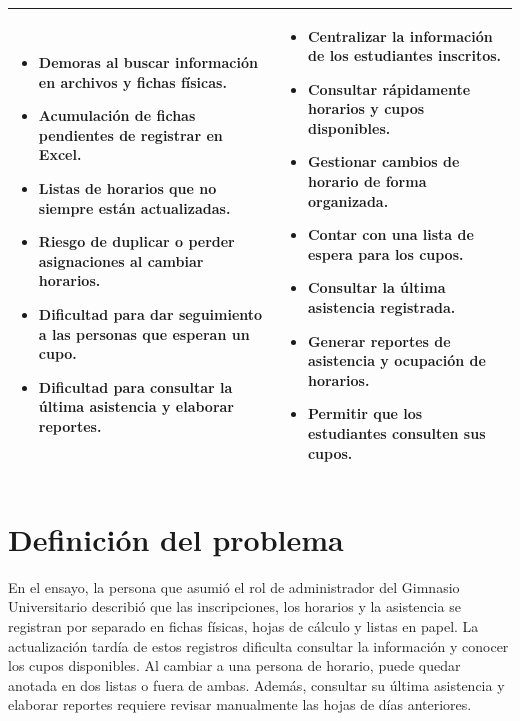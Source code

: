 \documentclass[11pt,a4paper]{article}
\begin{document}
\begin{center}
\begin{tabular}{|>{\raggedright\arraybackslash}p{}|
			>{\raggedright\arraybackslash}p{}|}
		\begin{itemize}[leftmargin=*,nosep,topsep=1pt]
			\item Demoras al buscar información en archivos y fichas físicas.
			\item Acumulación de fichas pendientes de registrar en Excel.
			\item Listas de horarios que no siempre están actualizadas.
			\item Riesgo de duplicar o perder asignaciones al cambiar horarios.
			\item Dificultad para dar seguimiento a las personas que esperan un cupo.
			\item Dificultad para consultar la última asistencia y elaborar reportes.
		\end{itemize}
		&
		\begin{itemize}[leftmargin=*,nosep,topsep=1pt]
			\item Centralizar la información de los estudiantes inscritos.
			\item Consultar rápidamente horarios y cupos disponibles.
			\item Gestionar cambios de horario de forma organizada.
			\item Contar con una lista de espera para los cupos.
			\item Consultar la última asistencia registrada.
			\item Generar reportes de asistencia y ocupación de horarios.
			\item Permitir que los estudiantes consulten sus cupos.
		\end{itemize}
		\\
		\hline
		
	\end{tabular}
\end{center}

\normalsize
\renewcommand{\arraystretch}{1.0}


\section{Definición del problema}

En el ensayo, la persona que asumió el rol de administrador del Gimnasio
Universitario describió que las inscripciones, los horarios y la asistencia
se registran por separado en fichas físicas, hojas de cálculo y listas en
papel. La actualización tardía de estos registros dificulta consultar la
información y conocer los cupos disponibles. Al cambiar a una persona de
horario, puede quedar anotada en dos listas o fuera de ambas. Además,
consultar su última asistencia y elaborar reportes requiere revisar
manualmente las hojas de días anteriores.
\end{document}
